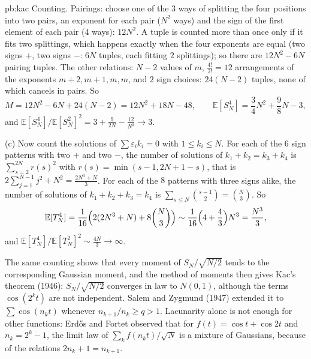 \begin{solution}{pb:kac}
Counting. Pairings: choose one of the $3$ ways of splitting the four positions into two pairs, an exponent for each pair ($N^2$
ways) and the sign of the first element of each pair ($4$ ways): $12N^2$. A tuple is counted more than once only if it fits two
splittings, which happens exactly when the four exponents are equal (two signs $+$, two signs $-$: $6N$ tuples, each fitting $2$
splittings); so there are $12N^2-6N$ pairing tuples. The other relations: $N-2$ values of $m$, $\frac{4!}{2!}=12$ arrangements of the exponents
$m+2,m+1,m,m$, and $2$ sign choices: $24(N-2)$ tuples, none of which cancels in pairs. So
\[
M=12N^2-6N+24(N-2)=12N^2+18N-48,\qquad\mathbb E[S_N^4]=\frac34N^2+\frac98N-3,
\]
and $\mathbb E[S_N^4]/\mathbb E[S_N^2]^2=3+\frac9{2N}-\frac{12}{N^2}\to3$.

(c) Now count the solutions of $\sum\varepsilon_ik_i=0$ with $1\le k_i\le N$. For each of the $6$ sign patterns with two $+$ and two $-$, the number of
solutions of $k_1+k_2=k_3+k_4$ is $\sum_{s=2}^{2N}r(s)^2$ with $r(s)=\min(s-1,2N+1-s)$, that is $2\sum_{j=1}^{N-1}j^2+N^2=\frac{2N^3+N}3$. For each of the $8$
patterns with three signs alike, the number of solutions of $k_1+k_2+k_3=k_4$ is $\sum_{s\le N}\binom{s-1}2=\binom N3$. So
\[
\mathbb E[T_N^4]=\frac1{16}\Bigl(2(2N^3+N)+8\binom N3\Bigr)\sim\frac1{16}\Bigl(4+\frac43\Bigr)N^3=\frac{N^3}3,
\]
and $\mathbb E[T_N^4]/\mathbb E[T_N^2]^2\sim\frac{4N}3\to\infty$.

\leads The same counting shows that every moment of $S_N/\sqrt{N/2}$ tends to the corresponding Gaussian moment, and the method of
moments then gives Kac's theorem (1946): $S_N/\sqrt{N/2}$ converges in law to $N(0,1)$, although the terms $\cos(2^kt)$ are not
independent. Salem and Zygmund (1947) extended it to $\sum\cos(n_kt)$ whenever $n_{k+1}/n_k\ge q>1$. Lacunarity alone is not enough for
other functions: Erdős and Fortet observed that for $f(t)=\cos t+\cos2t$ and $n_k=2^k-1$, the limit law of $\sum_kf(n_kt)/\sqrt N$ is a mixture of
Gaussians, because of the relations $2n_k+1=n_{k+1}$.
\end{solution}

